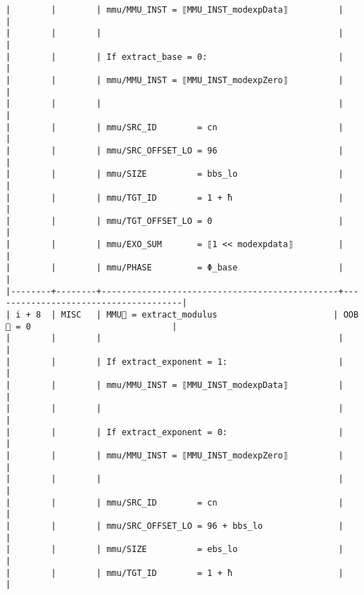 \documentclass[varwidth=\maxdimen,margin=0.5cm,multi={verbatim}]{standalone}
\begin{document}
\begin{verbatim}
|        |        | mmu/MMU_INST = ⟦MMU_INST_modexpData⟧          |                                      |
|        |        |                                               |                                      |
|        |        | If extract_base = 0:                          |                                      |
|        |        | mmu/MMU_INST = ⟦MMU_INST_modexpZero⟧          |                                      |
|        |        |                                               |                                      |
|        |        | mmu/SRC_ID        = cn                        |                                      |
|        |        | mmu/SRC_OFFSET_LO = 96                        |                                      |
|        |        | mmu/SIZE          = bbs_lo                    |                                      |
|        |        | mmu/TGT_ID        = 1 + ħ                     |                                      |
|        |        | mmu/TGT_OFFSET_LO = 0                         |                                      |
|        |        | mmu/EXO_SUM       = ⟦1 << modexpdata⟧         |                                      |
|        |        | mmu/PHASE         = Φ_base                    |                                      |
|--------+--------+-----------------------------------------------+--------------------------------------|
| i + 8  | MISC   | MMU🏴 = extract_modulus                       | OOB🏴 = 0                            |
|        |        |                                               |                                      |
|        |        | If extract_exponent = 1:                      |                                      |
|        |        | mmu/MMU_INST = ⟦MMU_INST_modexpData⟧          |                                      |
|        |        |                                               |                                      |
|        |        | If extract_exponent = 0:                      |                                      |
|        |        | mmu/MMU_INST = ⟦MMU_INST_modexpZero⟧          |                                      |
|        |        |                                               |                                      |
|        |        | mmu/SRC_ID        = cn                        |                                      |
|        |        | mmu/SRC_OFFSET_LO = 96 + bbs_lo               |                                      |
|        |        | mmu/SIZE          = ebs_lo                    |                                      |
|        |        | mmu/TGT_ID        = 1 + ħ                     |                                      |

\end{verbatim}
\end{document}
